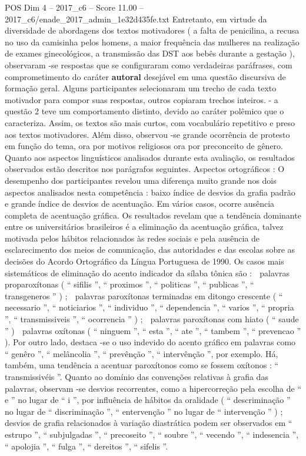 \begin{textsample}{POS Dim 4 – 2017\_c6 – Score 11.00 – 2017\_c6/enade\_2017\_admin\_1e32d435fe.txt}
Entretanto, em virtude da diversidade de abordagens dos textos motivadores ( a falta de penicilina, a recusa no uso da camisinha pelos homens, a maior frequência das mulheres na realização de exames ginecológicos, a transmissão das DST aos bebês durante a gestação ), observaram -se respostas que se configuraram como verdadeiras paráfrases, com comprometimento do caráter \textbf{autoral} desejável em uma questão discursiva de formação geral.
Alguns participantes selecionaram um trecho de cada texto motivador para compor suas respostas, outros copiaram trechos inteiros. - a questão 2 teve um comportamento distinto, devido ao caráter polêmico que o caracteriza.
Assim, os textos são mais curtos, com vocabulário repetitivo e preso aos textos motivadores.
Além disso, observou -se grande ocorrência de protesto em função do tema, ora por motivos religiosos ora por preconceito de gênero.
Quanto aos aspectos linguísticos analisados durante esta avaliação, os resultados observados estão descritos nos parágrafos seguintes.
Aspectos ortográficos : O desempenho dos participantes revelou uma diferença muito grande nos dois aspectos analisados nesta competência : baixo índice de desvios da grafia padrão e grande índice de desvios de acentuação.
Em vários casos, ocorre ausência completa de acentuação gráfica.
Os resultados revelam que a tendência dominante entre os universitários brasileiros é a eliminação da acentuação gráfica, talvez motivada pelos hábitos relacionados às redes sociais e pela ausência de esclarecimento dos meios de comunicação, das autoridades e das escolas sobre as decisões do Acordo Ortográfico da Língua Portuguesa de 1990.
Os casos mais sistemáticos de eliminação do acento indicador da sílaba tônica são :  palavras proparoxítonas ( “ sifilis ”, “ proximos ”, “ politicas ”, “ publicas ”, “ transgeneros ” ) ;  palavras paroxítonas terminadas em ditongo crescente ( “ necessario ”, “ noticiarios ”, “ individuo ”, “ dependencia ”, “ varios ”, “ propria ”, “ transmissiveis ”, “ ocorrencia ” ) ;  palavras paroxítonas com hiato ( “ saude ” )  palavras oxítonas ( “ ninguem ”, “ esta ”, “ ate ”, “ tambem ”, “ prevencao ” ).
Por outro lado, destaca -se o uso indevido do acento gráfico em palavras como “ genêro ”, “ melâncolia ”, “ prevênção ”, “ intervênção ”, por exemplo.
Há, também, uma tendência a acentuar paroxítonos como se fossem oxítonos : “ transmissivéis ”.
Quanto ao domínio das convenções relativas à grafia das palavras, observam -se desvios recorrentes, como a hipercorreção pela escolha de “ e ” no lugar de “ i ”, por influência de hábitos da oralidade ( “ descriminação ” no lugar de “ discriminação ”, “ entervenção ” no lugar de “ intervenção ” ) ; desvios de grafia relacionados à variação diastrática podem ser observados em “ estrupo ”, “ subjulgadas ”, “ precoseito ”, “ soubre ”, “ vecendo ”, “ indesencia ”, “ apolojia ”, “ fulga ”, “ dereitos ”, “ sifelis ”.

\end{textsample}
